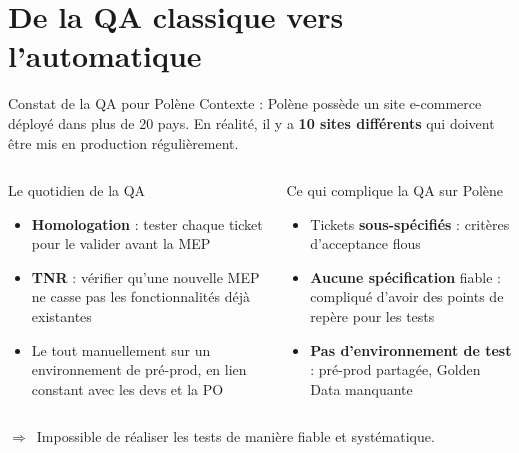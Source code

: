 \section{De la QA classique vers l'automatique}

\begin{frame}{Constat de la QA pour Polène}
  \footnotesize Contexte : Polène possède un site e-commerce déployé dans plus de 20 pays. En réalité, il y a \textbf{10 sites différents} qui doivent être mis en production régulièrement.
  \vskip 8pt
  \begin{columns}[T]
    \begin{block}{Le quotidien de la QA}
      \footnotesize
      \begin{itemize}
        \item \textbf{Homologation} : tester chaque ticket pour le valider avant la MEP
        \item \textbf{TNR} : vérifier qu'une nouvelle MEP ne casse pas les fonctionnalités déjà existantes
        \item Le tout manuellement sur un environnement de pré-prod, en lien constant avec les devs et la PO
      \end{itemize}
    \end{block}
    \begin{alertblock}{Ce qui complique la QA sur Polène}
      \footnotesize
      \begin{itemize}
        \item Tickets \textbf{sous-spécifiés} : critères d'acceptance flous
        \item \textbf{Aucune spécification} fiable : compliqué d'avoir des points de repère pour les tests
        \item \textbf{Pas d'environnement de test} : pré-prod partagée, Golden Data manquante
      \end{itemize}
    \end{alertblock}
  \end{columns}
  \vskip 16pt
  {\footnotesize $\Rightarrow$~Impossible de réaliser les tests de manière fiable et systématique.}
\end{frame}

